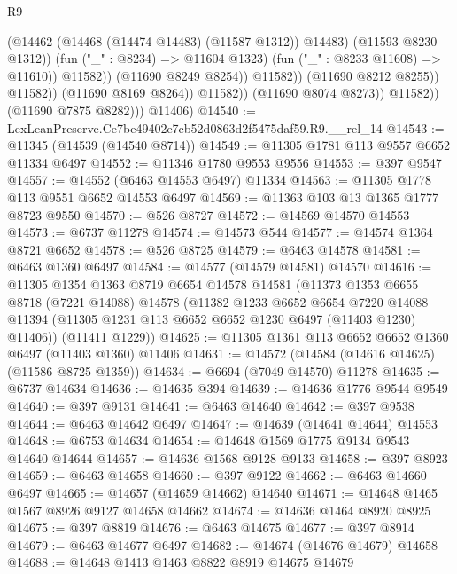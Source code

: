 \begin{lexlean}{R9}
\begin{coremodule}
                                          (@14462 (@14468 (@14474 @14483) (@11587 @1312)) @14483)
                                          (@11593 @8230 @1312))
                                        (fun ("_" : @8234) => @11604 @1323)
                                        (fun ("_" : @8233 @11608) => @11610))
                                      @11582))
                                  (@11690 @8249 @8254))
                                @11582))
                            (@11690 @8212 @8255))
                          @11582))
                      (@11690 @8169 @8264))
                    @11582))
                (@11690 @8074 @8273))
              @11582))
          (@11690 @7875 @8282)))
      @11406)
@14540 := LexLeanPreserve.Ce7be49402e7cb52d0863d2f5475daf59.R9.__rel_14
@14543 := @11345 (@14539 (@14540 @8714))
@14549 := @11305 @1781 @113 @9557 @6652 @11334 @6497
@14552 := @11346 @1780 @9553 @9556
@14553 := @397 @9547
@14557 := @14552 (@6463 @14553 @6497) @11334
@14563 := @11305 @1778 @113 @9551 @6652 @14553 @6497
@14569 := @11363 @103 @13 @1365 @1777 @8723 @9550
@14570 := @526 @8727
@14572 := @14569 @14570 @14553
@14573 := @6737 @11278
@14574 := @14573 @544
@14577 := @14574 @1364 @8721 @6652
@14578 := @526 @8725
@14579 := @6463 @14578
@14581 := @6463 @1360 @6497
@14584 := @14577 (@14579 @14581) @14570
@14616 := @11305
    @1354
    @1363
    @8719
    @6654
    @14578
    @14581
    (@11373
      @1353
      @6655
      @8718
      (@7221 @14088)
      @14578
      (@11382
        @1233
        @6652
        @6654
        @7220
        @14088
        @11394
        (@11305 @1231 @113 @6652 @6652 @1230 @6497 (@11403 @1230) @11406))
      (@11411 @1229))
@14625 := @11305 @1361 @113 @6652 @6652 @1360 @6497 (@11403 @1360) @11406
@14631 := @14572 (@14584 (@14616 @14625) (@11586 @8725 @1359))
@14634 := @6694 (@7049 @14570) @11278
@14635 := @6737 @14634
@14636 := @14635 @394
@14639 := @14636 @1776 @9544 @9549
@14640 := @397 @9131
@14641 := @6463 @14640
@14642 := @397 @9538
@14644 := @6463 @14642 @6497
@14647 := @14639 (@14641 @14644) @14553
@14648 := @6753 @14634
@14654 := @14648 @1569 @1775 @9134 @9543 @14640 @14644
@14657 := @14636 @1568 @9128 @9133
@14658 := @397 @8923
@14659 := @6463 @14658
@14660 := @397 @9122
@14662 := @6463 @14660 @6497
@14665 := @14657 (@14659 @14662) @14640
@14671 := @14648 @1465 @1567 @8926 @9127 @14658 @14662
@14674 := @14636 @1464 @8920 @8925
@14675 := @397 @8819
@14676 := @6463 @14675
@14677 := @397 @8914
@14679 := @6463 @14677 @6497
@14682 := @14674 (@14676 @14679) @14658
@14688 := @14648 @1413 @1463 @8822 @8919 @14675 @14679

\end{coremodule}
\end{lexlean}
